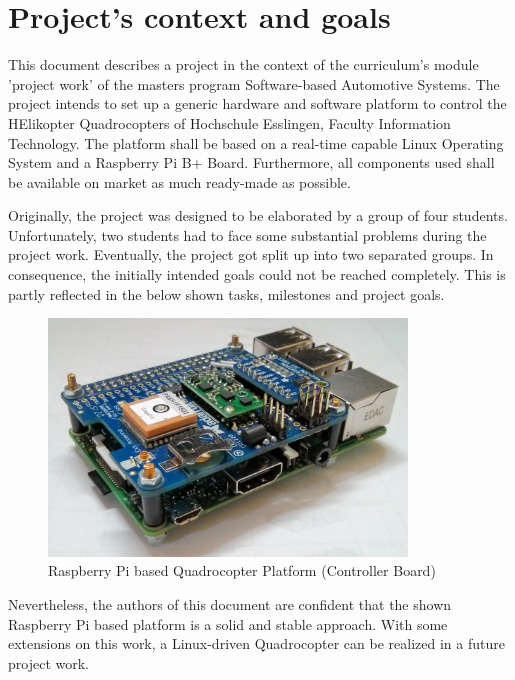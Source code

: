 \chapter{Project's context and goals}
\label{sec:projGoals}

This document describes a project in the context of the curriculum's module 'project work' of the masters program Software-based Automotive Systems. The project intends to set up a generic hardware and software platform to control the HElikopter Quadrocopters of Hochschule Esslingen, Faculty Information Technology. The platform shall be based on a real-time capable Linux Operating System and a Raspberry Pi B+ Board. Furthermore, all components used shall be available on market as much ready-made as possible.

Originally, the project was designed to be elaborated by a group of four students. Unfortunately, two students had to face some substantial problems during the project work. Eventually, the project got split up into two separated groups. In consequence, the initially intended goals could not be reached completely. This is partly reflected in the below shown tasks, milestones and project goals.

\begin{figure}[h]
    \centering
    \includegraphics[width=0.85\textwidth]{fig/ch-project-goals/MainRaspberryPi}
    \caption{Raspberry Pi based Quadrocopter Platform (Controller Board)}
    \label{fig:projGoals:RpiPic}
\end{figure}

Nevertheless, the authors of this document are confident that the shown Raspberry Pi based platform is a solid and stable approach. With some extensions on this work, a Linux-driven Quadrocopter can be realized in a future project work.

